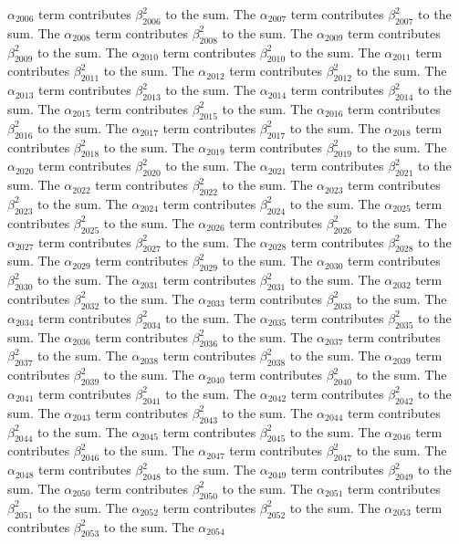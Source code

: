 \begin{lemma}
$\alpha_{2006}$ term contributes $\beta_{2006}^{2}$ to the sum. The $\alpha_{2007}$ term contributes $\beta_{2007}^{2}$ to the sum. The $\alpha_{2008}$ term contributes $\beta_{2008}^{2}$ to the sum. The $\alpha_{2009}$ term contributes $\beta_{2009}^{2}$ to the sum. The $\alpha_{2010}$ term contributes $\beta_{2010}^{2}$ to the sum. The $\alpha_{2011}$ term contributes $\beta_{2011}^{2}$ to the sum. The $\alpha_{2012}$ term contributes $\beta_{2012}^{2}$ to the sum. The $\alpha_{2013}$ term contributes $\beta_{2013}^{2}$ to the sum. The $\alpha_{2014}$ term contributes $\beta_{2014}^{2}$ to the sum. The $\alpha_{2015}$ term contributes $\beta_{2015}^{2}$ to the sum. The $\alpha_{2016}$ term contributes $\beta_{2016}^{2}$ to the sum. The $\alpha_{2017}$ term contributes $\beta_{2017}^{2}$ to the sum. The $\alpha_{2018}$ term contributes $\beta_{2018}^{2}$ to the sum. The $\alpha_{2019}$ term contributes $\beta_{2019}^{2}$ to the sum. The $\alpha_{2020}$ term contributes $\beta_{2020}^{2}$ to the sum. The $\alpha_{2021}$ term contributes $\beta_{2021}^{2}$ to the sum. The $\alpha_{2022}$ term contributes $\beta_{2022}^{2}$ to the sum. The $\alpha_{2023}$ term contributes $\beta_{2023}^{2}$ to the sum. The $\alpha_{2024}$ term contributes $\beta_{2024}^{2}$ to the sum. The $\alpha_{2025}$ term contributes $\beta_{2025}^{2}$ to the sum. The $\alpha_{2026}$ term contributes $\beta_{2026}^{2}$ to the sum. The $\alpha_{2027}$ term contributes $\beta_{2027}^{2}$ to the sum. The $\alpha_{2028}$ term contributes $\beta_{2028}^{2}$ to the sum. The $\alpha_{2029}$ term contributes $\beta_{2029}^{2}$ to the sum. The $\alpha_{2030}$ term contributes $\beta_{2030}^{2}$ to the sum. The $\alpha_{2031}$ term contributes $\beta_{2031}^{2}$ to the sum. The $\alpha_{2032}$ term contributes $\beta_{2032}^{2}$ to the sum. The $\alpha_{2033}$ term contributes $\beta_{2033}^{2}$ to the sum. The $\alpha_{2034}$ term contributes $\beta_{2034}^{2}$ to the sum. The $\alpha_{2035}$ term contributes $\beta_{2035}^{2}$ to the sum. The $\alpha_{2036}$ term contributes $\beta_{2036}^{2}$ to the sum. The $\alpha_{2037}$ term contributes $\beta_{2037}^{2}$ to the sum. The $\alpha_{2038}$ term contributes $\beta_{2038}^{2}$ to the sum. The $\alpha_{2039}$ term contributes $\beta_{2039}^{2}$ to the sum. The $\alpha_{2040}$ term contributes $\beta_{2040}^{2}$ to the sum. The $\alpha_{2041}$ term contributes $\beta_{2041}^{2}$ to the sum. The $\alpha_{2042}$ term contributes $\beta_{2042}^{2}$ to the sum. The $\alpha_{2043}$ term contributes $\beta_{2043}^{2}$ to the sum. The $\alpha_{2044}$ term contributes $\beta_{2044}^{2}$ to the sum. The $\alpha_{2045}$ term contributes $\beta_{2045}^{2}$ to the sum. The $\alpha_{2046}$ term contributes $\beta_{2046}^{2}$ to the sum. The $\alpha_{2047}$ term contributes $\beta_{2047}^{2}$ to the sum. The $\alpha_{2048}$ term contributes $\beta_{2048}^{2}$ to the sum. The $\alpha_{2049}$ term contributes $\beta_{2049}^{2}$ to the sum. The $\alpha_{2050}$ term contributes $\beta_{2050}^{2}$ to the sum. The $\alpha_{2051}$ term contributes $\beta_{2051}^{2}$ to the sum. The $\alpha_{2052}$ term contributes $\beta_{2052}^{2}$ to the sum. The $\alpha_{2053}$ term contributes $\beta_{2053}^{2}$ to the sum. The $\alpha_{2054}$ 
\end{lemma}
